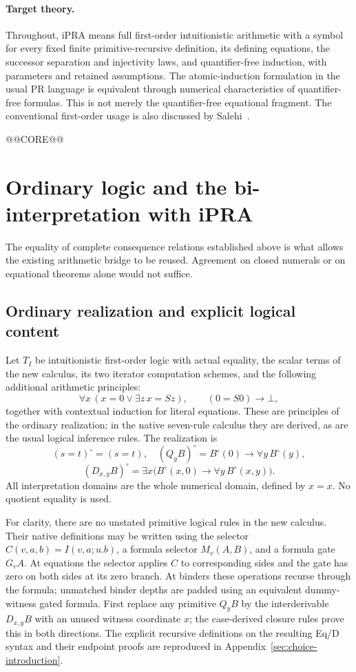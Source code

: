 \documentclass[11pt]{article}
\theoremstyle{definition}
\theoremstyle{remark}
\begin{document}
\paragraph{Target theory.}
Throughout, iPRA means full first-order intuitionistic arithmetic with a
symbol for every fixed finite primitive-recursive definition, its defining
equations, the successor separation and injectivity laws, and
quantifier-free induction, with parameters and retained assumptions.
The atomic-induction formulation in the usual PR language is equivalent
through numerical characteristics of quantifier-free formulas. This is
not merely the quantifier-free equational fragment. The conventional
first-order usage is also discussed by Salehi~\cite{salehi}.

@@CORE@@

\section{Ordinary logic and the bi-interpretation with iPRA}
\label{sec:interpretation}

The equality of complete consequence relations established above is what
allows the existing arithmetic bridge to be reused. Agreement on closed
numerals or on equational theorems alone would not suffice.

\subsection{Ordinary realization and explicit logical content}

Let \(T_I\) be intuitionistic first-order logic with actual equality, the
scalar terms of the new calculus, its two iterator computation schemes,
and the following additional arithmetic principles:
\[
 \forall x\,(x=0\lor\exists z\,x=Sz),\qquad
 (0=S0)\to\bot,
\]
together with contextual induction for literal equations. These are
principles of the ordinary realization; in the native seven-rule calculus
they are derived, as are the usual logical inference rules.
The realization is
\[
 (s=t)^\circ=(s=t),\quad
 (Q_y B)^\circ=B^\circ(0)\to\forall y\,B^\circ(y),
\]
\[
 (D_{x,y}B)^\circ=
 \exists x\bigl(B^\circ(x,0)\to\forall y\,B^\circ(x,y)\bigr).
\]
All interpretation domains are the whole numerical domain, defined by
\(x=x\). No quotient equality is used.

For clarity, there are no unstated primitive logical rules in the new
calculus. Their native definitions may be written using the selector
\(C(v,a,b)=I(v,a;u.b)\), a formula selector \(M_v(A,B)\), and a formula
gate \(G_vA\). At equations the selector applies \(C\) to corresponding
sides and the gate has zero on both sides at its zero branch. At binders
these operations recurse through the formula; unmatched binder depths are
padded using an equivalent dummy-witness gated formula. First replace any
primitive \(Q_yB\) by the interderivable \(D_{x,y}B\) with an unused
witness coordinate \(x\); the case-derived closure rules prove this in
both directions. The explicit recursive definitions on the resulting
Eq/D syntax and their endpoint proofs are reproduced in
Appendix~\ref{sec:choice-introduction}.
\end{document}
